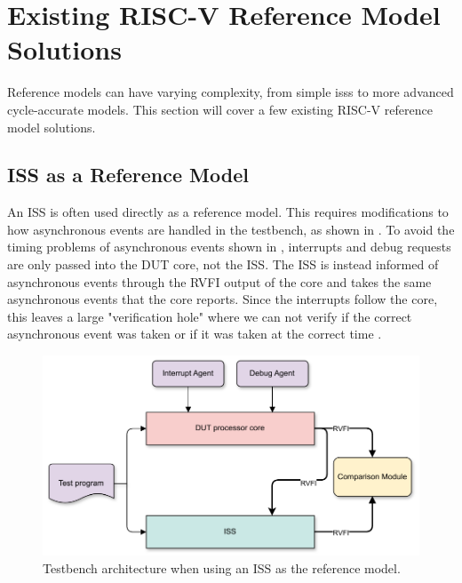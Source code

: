 \section{Existing RISC-V Reference Model Solutions}
\label{sec:bg_existingReference}

Reference models can have varying complexity, from simple  \acrshort{iss}s to more advanced cycle-accurate models. This section will cover a few existing RISC-V reference model solutions.

\subsection{ISS as a Reference Model}
\label{sec:bg_iss_refmod}

An ISS is often used directly as a reference model. This requires modifications to how asynchronous events are handled in the testbench, as shown in . To avoid the timing problems of asynchronous events shown in , interrupts and debug requests are only passed into the DUT core, not the ISS. The ISS is instead informed of asynchronous events through the RVFI output of the core and takes the same asynchronous events that the core reports. Since the interrupts follow the core, this leaves a large "verification hole" where we can not verify if the correct asynchronous event was taken or if it was taken at the correct time \cite{taylorAdvancedRISCVVerification2023}. 

\begin{figure}
    \centering
    \includegraphics[width=0.75\linewidth]{figures/ISS_architecture.pdf}
    \caption{Testbench architecture when using an ISS as the reference model.}
    \label{fig:iss_testbench}
\end{figure}
%

